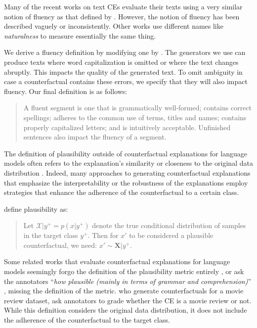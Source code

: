 \documentclass[11pt]{article}
\begin{document}
Many of the recent works on text CEs \cite{dathathri_plug_2019, wu_polyjuice_2021, madaan_generate_2021, ross_explaining_2021, betti_relevance-based_2023} evaluate their texts using a very similar notion of fluency as that defined by \citet{white_arpa_1994}. However, the notion of fluency has been described vaguely or inconsistently. Other works use different names like \textit{naturalness} \cite{robeer_generating_2021, treviso_crest_2023} to measure essentially the same thing. 

We derive a fluency definition by modifying one by \citet{ma_corpus_2006}. The generators we use can produce texts where word capitalization is omitted or where the text changes abruptly. This impacts the quality of the generated text. To omit ambiguity in case a counterfactual contains these errors, we specify that they will also impact fluency. Our final definition is as follows: 

\begin{quote}
    A fluent segment is one that is grammatically well-formed; contains correct spellings; adheres to the common use of terms, titles and names; contains properly capitalized letters; and is intuitively acceptable. Unfinished sentences also impact the fluency of a segment.
\end{quote}

The definition of plausibility outside of counterfactual explanations for language models often refers to the explanation's similarity or closeness to the original data distribution \cite{kenny_generating_2021}. Indeed, many approaches to generating counterfactual explanations that emphasize the interpretability \cite{van_looveren_interpretable_2021} or the robustness \cite{artelt_evaluating_2021} of the explanations employ strategies that enhance the adherence of the counterfactual to a certain class. 

\citet{altmeyer_faithful_2024} define plausibility as:

\begin{quote}
    Let $\mathcal{X}|y^+ = p(x|y^+)$ denote the true conditional distribution of samples in the target class $y^+$. Then for $x'$ to be considered a plausible counterfactual, we need: $x' \sim \mathbf{X} |y^+$.
\end{quote}


Some related works that evaluate counterfactual explanations for language models seemingly forgo the definition of the plausibility metric entirely \cite{madaan_generate_2021}, or ask the annotators ``\textit{how plausible (mainly in terms of grammar and comprehension)}'' \cite{yang_generating_2020}, missing the definition of the metric. \citet{gilo_general_2024} who generate counterfactuals for a movie review dataset, ask annotators to grade whether the CE is a movie review or not. While this definition considers the original data distribution, it does not include the adherence of the counterfactual to the target class.
\end{document}
